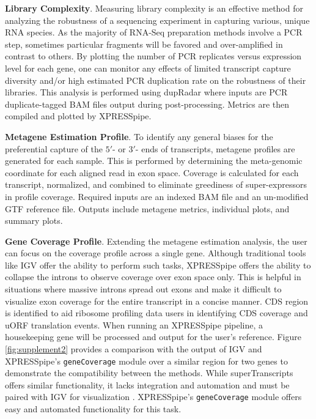 \documentclass[10pt, oneside]{article}
\begin{document}
\noindent\textbf{Library Complexity}. Measuring library complexity is an effective method for analyzing the robustness of a sequencing experiment in capturing various, unique RNA species. As the majority of RNA-Seq preparation methods involve a PCR step, sometimes particular fragments will be favored and over-amplified in contrast to others. By plotting the number of PCR replicates versus expression level for each gene, one can monitor any effects of limited transcript capture diversity and/or high estimated PCR duplication rate on the robustness of their libraries. This analysis is performed using dupRadar \cite{dupradar} where inputs are PCR duplicate-tagged BAM files output during post-processing. Metrics are then compiled and plotted by XPRESSpipe. \par

\noindent\textbf{Metagene Estimation Profile}. To identify any general biases for the preferential capture of the $5'$- or $3'$- ends of transcripts, metagene profiles are generated for each sample. This is performed by determining the meta-genomic coordinate for each aligned read in exon space. Coverage is calculated for each transcript, normalized, and combined to eliminate greediness of super-expressors in profile coverage. Required inputs are an indexed BAM file and an un-modified GTF reference file. Outputs include metagene metrics, individual plots, and summary plots. \par

\noindent\textbf{Gene Coverage Profile}. Extending the metagene estimation analysis, the user can focus on the coverage profile across a single gene. Although traditional tools like IGV \cite{igv} offer the ability to perform such tasks, XPRESSpipe offers the ability to collapse the introns to observe coverage over exon space only. This is helpful in situations where massive introns spread out exons and make it difficult to visualize exon coverage for the entire transcript in a concise manner. CDS region is identified to aid ribosome profiling data users in identifying CDS coverage and uORF translation events. When running an XPRESSpipe pipeline, a housekeeping gene will be processed and output for the user's reference. Figure \ref{fig:supplement2} provides a comparison with the output of IGV \cite{igv} and XPRESSpipe's \texttt{geneCoverage} module over a similar region for two genes to demonstrate the compatibility between the methods. While superTranscripts offers similar functionality, it lacks integration and automation and must be paired with IGV for visualization \cite{supertranscripts}. XPRESSpipe's \texttt{geneCoverage} module offers easy and automated functionality for this task. \par
\end{document}
